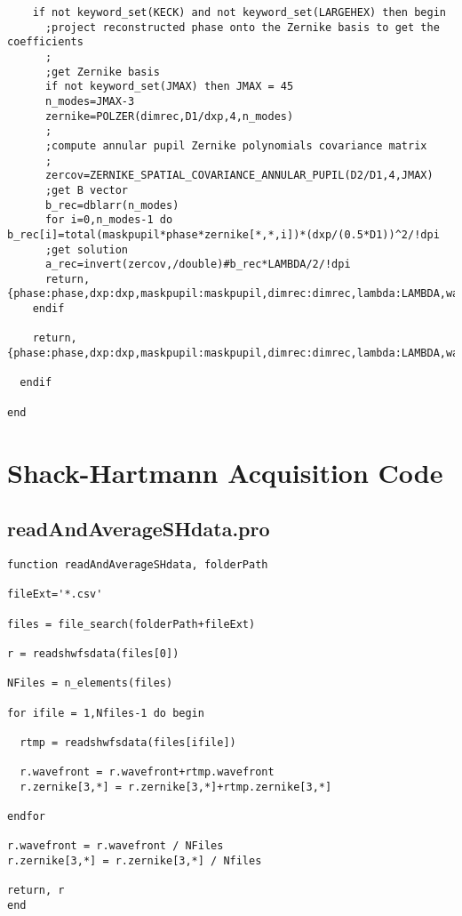 \begin{lstlisting}
    if not keyword_set(KECK) and not keyword_set(LARGEHEX) then begin
      ;project reconstructed phase onto the Zernike basis to get the coefficients
      ;
      ;get Zernike basis
      if not keyword_set(JMAX) then JMAX = 45
      n_modes=JMAX-3
      zernike=POLZER(dimrec,D1/dxp,4,n_modes)
      ;
      ;compute annular pupil Zernike polynomials covariance matrix
      ;
      zercov=ZERNIKE_SPATIAL_COVARIANCE_ANNULAR_PUPIL(D2/D1,4,JMAX)
      ;get B vector
      b_rec=dblarr(n_modes)
      for i=0,n_modes-1 do b_rec[i]=total(maskpupil*phase*zernike[*,*,i])*(dxp/(0.5*D1))^2/!dpi
      ;get solution
      a_rec=invert(zercov,/double)#b_rec*LAMBDA/2/!dpi
      return,{phase:phase,dxp:dxp,maskpupil:maskpupil,dimrec:dimrec,lambda:LAMBDA,wavefront:LAMBDA/2/!dpi*phase,a_j:a_rec,j:indgen(n_modes)+4}
    endif

    return,{phase:phase,dxp:dxp,maskpupil:maskpupil,dimrec:dimrec,lambda:LAMBDA,wavefront:LAMBDA/2/!dpi*phase}

  endif

end

\end{lstlisting}

\section{Shack-Hartmann Acquisition Code}
\label{app:SHacquisCode}

\subsection{readAndAverageSHdata.pro}
\label{subapp:readAndAverageSHdata}

\begin{lstlisting}
function readAndAverageSHdata, folderPath

fileExt='*.csv'

files = file_search(folderPath+fileExt)

r = readshwfsdata(files[0])

NFiles = n_elements(files)

for ifile = 1,Nfiles-1 do begin
  
  rtmp = readshwfsdata(files[ifile])
  
  r.wavefront = r.wavefront+rtmp.wavefront
  r.zernike[3,*] = r.zernike[3,*]+rtmp.zernike[3,*]
  
endfor

r.wavefront = r.wavefront / NFiles
r.zernike[3,*] = r.zernike[3,*] / Nfiles

return, r
end
\end{lstlisting}

